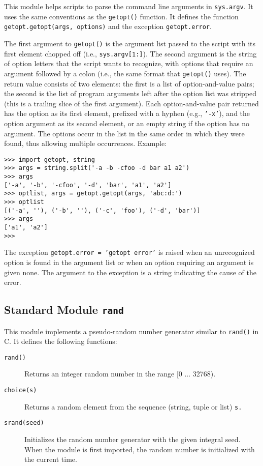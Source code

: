 This module helps scripts to parse the command line arguments in
{\tt sys.argv}.
It uses the same conventions as the {\UNIX}
{\tt getopt()}
function.
It defines the function
{\tt getopt.getopt(args, options)}
and the exception
{\tt getopt.error}.

The first argument to
{\tt getopt()}
is the argument list passed to the script with its first element
chopped off (i.e.,
{\tt sys.argv[1:]}).
The second argument is the string of option letters that the
script wants to recognize, with options that require an argument
followed by a colon (i.e., the same format that {\UNIX}
{\tt getopt()}
uses).
The return value consists of two elements: the first is a list of
option-and-value pairs; the second is the list of program arguments
left after the option list was stripped (this is a trailing slice of the
first argument).
Each option-and-value pair returned has the option as its first element,
prefixed with a hyphen (e.g.,
{\tt '-x'}),
and the option argument as its second element, or an empty string if the
option has no argument.
The options occur in the list in the same order in which they were
found, thus allowing multiple occurrences.
Example:
\begin{code}\begin{verbatim}
>>> import getopt, string
>>> args = string.split('-a -b -cfoo -d bar a1 a2')
>>> args
['-a', '-b', '-cfoo', '-d', 'bar', 'a1', 'a2']
>>> optlist, args = getopt.getopt(args, 'abc:d:')
>>> optlist
[('-a', ''), ('-b', ''), ('-c', 'foo'), ('-d', 'bar')]
>>> args
['a1', 'a2']
>>> 
\end{verbatim}\end{code}
The exception
{\tt getopt.error = 'getopt error'}
is raised when an unrecognized option is found in the argument list or
when an option requiring an argument is given none.
The argument to the exception is a string indicating the cause of the
error.

\subsection{Standard Module {\tt rand}}

This module implements a pseudo-random number generator similar to
{\tt rand()}
in C.
It defines the following functions:
\begin{description}
\item[{\tt rand()}]
Returns an integer random number in the range [0 ... 32768).
\item[{\tt choice(s)}]
Returns a random element from the sequence (string, tuple or list)
{\tt s.}
\item[{\tt srand(seed)}]
Initializes the random number generator with the given integral seed.
When the module is first imported, the random number is initialized with
the current time.
\end{description}

